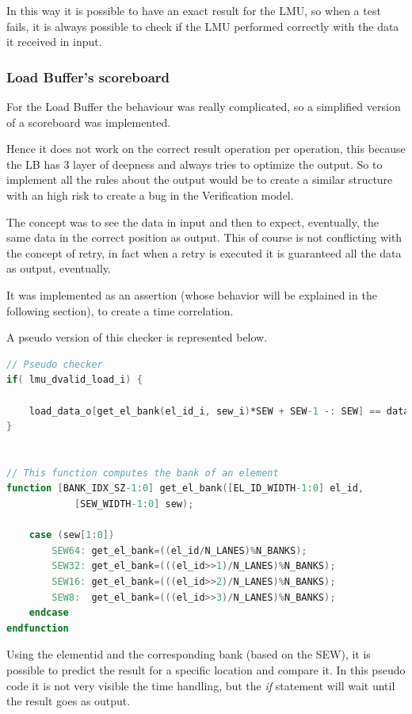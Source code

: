 In this way it is possible to have an exact result for the LMU, so when a test fails, it is always possible to check if the LMU performed correctly with the data it received in input.

\subsubsection{Load Buffer's scoreboard}
For the Load Buffer the behaviour was really complicated, so a simplified  version of a scoreboard was implemented.

Hence it does not work on the correct result operation per operation, this because the LB has 3 layer of deepness and always tries to optimize the output. So to implement all the rules about the output would be to create a similar structure with an high risk to create a bug in the Verification model.

The concept was to see the data in input and then to expect, eventually, the same data in the correct position as output. This of course is not conflicting with the concept of retry, in fact when a retry is executed it is guaranteed all the data as output, eventually.

It was implemented as an assertion (whose behavior will be explained in the following section), to create a time correlation.

A pseudo version of this checker is represented below.
\bigskip

\linespread{1}

\begin{lstlisting}[language=Verilog,style=verilog-style, backgroundcolor=\color{lyel_palette}, frame=tlb]
// Pseudo checker
if( lmu_dvalid_load_i) { 

    load_data_o[get_el_bank(el_id_i, sew_i)*SEW + SEW-1 -: SEW] == data_i;
}


// This function computes the bank of an element
function [BANK_IDX_SZ-1:0] get_el_bank([EL_ID_WIDTH-1:0] el_id,
            [SEW_WIDTH-1:0] sew);
            
    case (sew[1:0])
        SEW64: get_el_bank=((el_id/N_LANES)%N_BANKS); 
        SEW32: get_el_bank=(((el_id>>1)/N_LANES)%N_BANKS); 
        SEW16: get_el_bank=(((el_id>>2)/N_LANES)%N_BANKS); 
        SEW8:  get_el_bank=(((el_id>>3)/N_LANES)%N_BANKS); 
    endcase
endfunction

\end{lstlisting}

\linespread{1.2}
\bigskip

Using the element\+id and the corresponding bank (based on the SEW), it is possible to predict the result for a specific location and compare it. In this pseudo code it is not very visible the time handling, but the \emph{if} statement will wait until the result goes as output.


